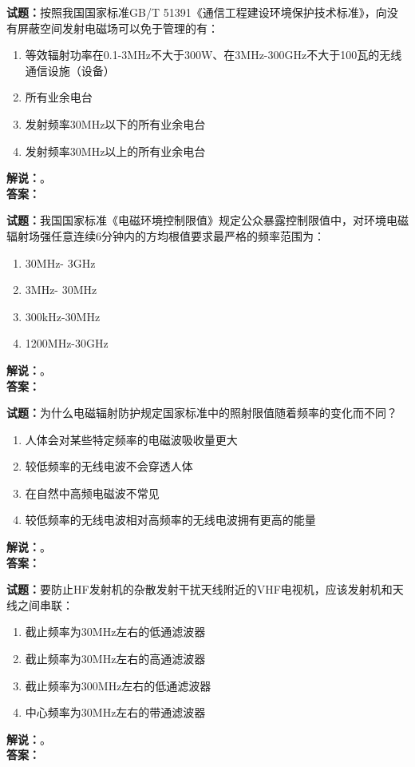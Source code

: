 \documentclass{ctexbook}
\begin{document}
\noindent\textbf{试题：}按照我国国家标准GB/T 51391《通信工程建设环境保护技术标准》，向没有屏蔽空间发射电磁场可以免于管理的有： 
\begin{enumerate}[leftmargin=3em]
\item 等效辐射功率在0.1-3\unit{\MHz}不大于300W、在3\unit{\MHz}-300\unit{\GHz}不大于100瓦的无线通信设施（设备） 
\item 所有业余电台
\item 发射频率30\unit{\MHz}以下的所有业余电台
\item 发射频率30\unit{\MHz}以上的所有业余电台
\end{enumerate}
\noindent\textbf{解说：}\textbf{}。
\\\noindent\textbf{答案：}

\bigskip




\noindent\textbf{试题：}我国国家标准《电磁环境控制限值》规定公众暴露控制限值中，对环境电磁辐射场强任意连续6分钟内的方均根值要求最严格的频率范围为： 
\begin{enumerate}[leftmargin=3em]
\item 30\unit{\MHz}- 3\unit{\GHz}
\item 3\unit{\MHz}- 30\unit{\MHz}
\item 300\unit{\kHz}-30\unit{\MHz}
\item 1200\unit{\MHz}-30\unit{\GHz}
\end{enumerate}
\noindent\textbf{解说：}\textbf{}。\\\noindent\textbf{答案：}

\bigskip




\noindent\textbf{试题：}为什么电磁辐射防护规定国家标准中的照射限值随着频率的变化而不同？
\begin{enumerate}[leftmargin=3em]
\item 人体会对某些特定频率的电磁波吸收量更大
\item 较低频率的无线电波不会穿透人体
\item 在自然中高频电磁波不常见
\item 较低频率的无线电波相对高频率的无线电波拥有更高的能量
\end{enumerate}
\noindent\textbf{解说：}\textbf{}。\\\noindent\textbf{答案：}

\bigskip




\noindent\textbf{试题：}要防止HF发射机的杂散发射干扰天线附近的VHF电视机，应该发射机和天线之间串联：
\begin{enumerate}[leftmargin=3em]
\item 截止频率为30\unit{\MHz}左右的低通滤波器
\item 截止频率为30\unit{\MHz}左右的高通滤波器
\item 截止频率为300\unit{\MHz}左右的低通滤波器
\item 中心频率为30\unit{\MHz}左右的带通滤波器
\end{enumerate}
\noindent\textbf{解说：}\textbf{}。\\\noindent\textbf{答案：}
\end{document}
